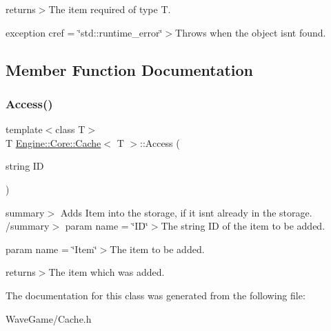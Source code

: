 returns$>$The item required of type T.

exception cref = \char`\"{}std\+::runtime\+\_\+error\char`\"{}$>$Throws when the object isn\textquotesingle{}t found.

\subsection{Member Function Documentation}
\mbox{\label{class_engine_1_1_core_1_1_cache_a1a4d83ac2cc8656acb5c99e4999e1551}} 
\subsubsection{\texorpdfstring{Access()}{Access()}}
{\footnotesize\ttfamily template$<$class T$>$ \\
T \hyperlink{class_engine_1_1_core_1_1_cache}{Engine\+::\+Core\+::\+Cache}$<$ T $>$\+::Access (\begin{DoxyParamCaption}\item[{string}]{ID }\end{DoxyParamCaption})\hspace{0.3cm}{\ttfamily [inline]}}

summary$>$ Adds Item into the storage, if it isn\textquotesingle{}t already in the storage. /summary$>$ param name = \char`\"{}\+I\+D\char`\"{}$>$The string ID of the item to be added.

param name = \char`\"{}\+Item\char`\"{}$>$The item to be added.

returns$>$The item which was added.

The documentation for this class was generated from the following file\+:\begin{DoxyCompactItemize}
\item 
Wave\+Game/Cache.\+h\end{DoxyCompactItemize}
